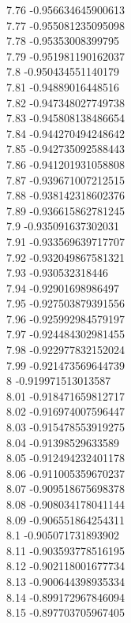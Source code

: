 {7.76	-0.956634645900613\\
7.77	-0.955081235095098\\
7.78	-0.95353008399795\\
7.79	-0.951981190162037\\
7.8	-0.950434551140179\\
7.81	-0.94889016448516\\
7.82	-0.947348027749738\\
7.83	-0.945808138486654\\
7.84	-0.944270494248642\\
7.85	-0.942735092588443\\
7.86	-0.941201931058808\\
7.87	-0.939671007212515\\
7.88	-0.938142318602376\\
7.89	-0.936615862781245\\
7.9	-0.935091637302031\\
7.91	-0.933569639717707\\
7.92	-0.932049867581321\\
7.93	-0.930532318446\\
7.94	-0.92901698986497\\
7.95	-0.927503879391556\\
7.96	-0.925992984579197\\
7.97	-0.924484302981455\\
7.98	-0.922977832152024\\
7.99	-0.921473569644739\\
8	-0.919971513013587\\
8.01	-0.918471659812717\\
8.02	-0.916974007596447\\
8.03	-0.915478553919275\\
8.04	-0.91398529633589\\
8.05	-0.912494232401178\\
8.06	-0.911005359670237\\
8.07	-0.909518675698378\\
8.08	-0.908034178041144\\
8.09	-0.906551864254311\\
8.1	-0.905071731893902\\
8.11	-0.903593778516195\\
8.12	-0.902118001677734\\
8.13	-0.900644398935334\\
8.14	-0.899172967846094\\
8.15	-0.897703705967405\\
}
